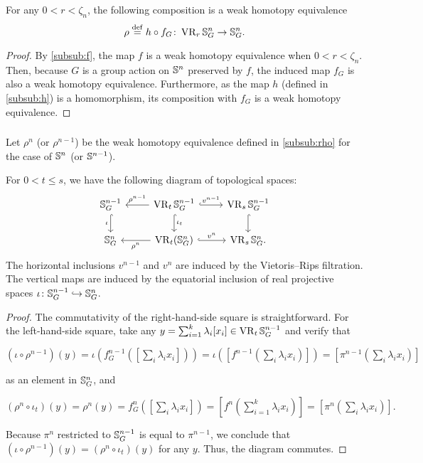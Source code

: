 \medskip\lemma
For any $0<r<\zeta_n$, the following composition is a weak homotopy equivalence
\[
    \rho \stackrel{\mathrm{def}}{=} h \circ f_G 
    \colon \operatorname{VR}_r\mathbb{S}^n_G \to \mathbb{S}^n_G.
\]
\begin{proof}
        By \cref{subsub:f}, the map $f$ is a weak homotopy equivalence when $0<r<\zeta_n$.
        Then, because $G$ is a group action on $\mathbb{S}^n$ preserved by $f$, the induced map $f_G$ is also a weak homotopy equivalence.
        Furthermore, as the map $h$ (defined in \cref{subsub:h}) is a homomorphism, its composition with $f_G$ is a weak homotopy equivalence.
\end{proof}

\subsubsection{} 

Let $\rho^n$ (or $\rho^{n-1}$) be the weak homotopy equivalence defined in \cref{subsub:rho} for the case of $\mathbb{S}^n$ (or $\mathbb{S}^{n-1}$). 

\medskip\lemma
For $0<t\leq s $, we have the following diagram of topological spaces:
\begin{equation}\label{d:fundamental_bars_diagram}
    \begin{tikzcd}
        \bS^{n-1}_G
        \ar[d, hook,"{\iota}" left]
        &
        \VR_t\bS^{n-1}_G
        \ar[d, hook,"\iota_t"]
        \ar[l, "\rho^{n-1}" above]
        \ar[r, hook, "v^{n-1}"]
        &
        \VR_{s}\bS^{n-1}_G
        \ar[d, hook]
        \\
        \bS^{n}_G
        &
        \VR_t(\bS^{n}_G)
        \ar[l, "\rho^n" below]
        \ar[r, hook, "v^{n}"]
        &
        \VR_{s}\bS^{n}_G.
    \end{tikzcd}
\end{equation}
The horizontal inclusions $v^{n-1}$ and $v^n$ are induced by the Vietoris--Rips filtration. 
The vertical maps are induced by the equatorial inclusion of real projective spaces $\iota \colon \mathbb{S}^{n-1}_G \hookrightarrow \mathbb{S}^{n}_G$.

\begin{proof}
        The commutativity of the right-hand-side square is straightforward.
        For the left-hand-side square, take any $y = \sum_{i=1}^k \lambda_i [x_i] \in \operatorname{VR}_t\mathbb{S}^{n-1}_G$ and verify that
        \begin{center}
            $(\iota \circ \rho^{n-1})(y)
            =\iota(f^{n-1}_G([\sum_i \lambda_i x_i]))
            =\iota([f^{n-1}(\sum_i \lambda_i x_i)])
            =[\pi^{n-1}(\sum_i \lambda_i x_i)]
            $
        \end{center}
        as an element in $\mathbb{S}^n_G$, and
        \begin{center}
            $(\rho^{n} \circ \iota_t)(y) = \rho^{n}(y) = f^{n}_G([\sum_i \lambda_i x_i]) = [f^{n}(\sum_{i=1}^k \lambda_i x_i)] = [\pi^{n}(\sum_i \lambda_i x_i)].
            $
        \end{center}
        Because $\pi^{n}$ restricted to $\mathbb{S}^{n-1}_G$ is equal to $\pi^{n-1}$, we conclude that $(\iota \circ \rho^{n-1})(y) = (\rho^n \circ \iota_t)(y)$ for any $y$.
        Thus, the diagram commutes.
\end{proof}

